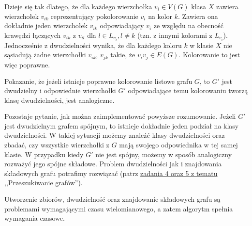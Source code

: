 Dzieje się tak dlatego, że dla każdego wierzchołka $v_i\in V(G)$ klasa $X$ zawiera wierzchołek $v_{ik}$ reprezentujący pokolorowanie $v_i$ na kolor $k$. Zawiera ona dokładnie jeden wierzchołek $v_{ik}$ odpowiadający $v_i$ ze względu na obecność krawędzi łączących $v_{ik}$ z $v_{il}$ dla $l \in L_{v_i}, l \neq k$ (tzn. z innymi kolorami z $L_{v_i}$). Jednocześnie z dwudzielności wynika, że dla każdego koloru $k$ w klasie $X$ nie sąsiadują żadne wierzchołki $v_{ik}$, $v_{jk}$ takie, że $v_iv_j\in E(G)$. Kolorowanie to jest więc poprawne.

Pokazanie, że jeżeli istnieje poprawne kolorowanie listowe grafu $G$, to $G'$ jest dwudzielny i odpowiednie wierzchołki $G'$ odpowiadające temu kolorowaniu tworzą klasę dwudzielności, jest analogiczne. 

Pozostaje pytanie, jak można zaimplementować powyższe rozumowanie. Jeżeli $G'$ jest dwudzielnym grafem spójnym, to istnieje dokładnie jeden podział na klasy dwudzielności. W takiej sytuacji możemy znaleźć klasy dwudzielności oraz zbadać, czy wszystkie wierzchołki z $G$ mają swojego odpowiednika w tej samej klasie. W przypadku kiedy $G'$ nie jest spójny, możemy w sposób analogiczny rozważyć jego spójne składowe. Problem dwudzielności jak i znajdowania składowych grafu potrafimy rozwiązać (patrz \hyperref[exc:bipart]{zadania 4 oraz 5 z tematu ,,Przeszukiwanie grafów''}).

Utworzenie zbiorów, dwudzielność oraz znajdowanie składowych grafu są problemami wymagającymi czasu wielomianowego, a zatem algorytm spełnia wymagania czasowe.

